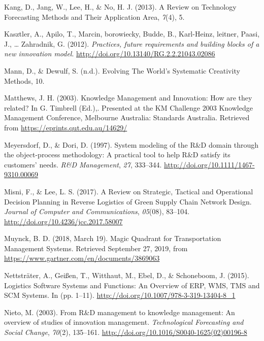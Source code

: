 \documentclass[12pt,twoside]{reedthesis}
\begin{document}
\leavevmode\hypertarget{ref-kangReviewTechnologyForecasting2013}{}%
Kang, D., Jang, W., Lee, H., \& No, H. J. (2013). A Review on Technology Forecasting Methods and Their Application Area, \emph{7}(4), 5.

\leavevmode\hypertarget{ref-kasztlerPracticesFutureRequirements2012}{}%
Kasztler, A., Apilo, T., Marcin, borowiecky, Budde, B., Karl-Heinz, leitner, Paasi, J., \ldots{} Zahradnik, G. (2012). \emph{Practices, future requirements and building blocks of a new innovation model}. \url{http://doi.org/10.13140/RG.2.2.21043.02086}

\leavevmode\hypertarget{ref-mannEvolvingWorldSystematic}{}%
Mann, D., \& Dewulf, S. (n.d.). Evolving The World's Systematic Creativity Methods, 10.

\leavevmode\hypertarget{ref-matthewsKnowledgeManagementInnovation2003}{}%
Matthews, J. H. (2003). Knowledge Management and Innovation: How are they related? In G. Timbrell (Ed.),. Presented at the KM Challenge 2003 Knowledge Management Conference, Melbourne Australia: Standards Australia. Retrieved from \url{https://eprints.qut.edu.au/14629/}

\leavevmode\hypertarget{ref-meyersdorfSystemModelingDomain1997}{}%
Meyersdorf, D., \& Dori, D. (1997). System modeling of the R\&D domain through the object-process methodology: A practical tool to help R\&D satisfy its customers' needs. \emph{R\&D Management}, \emph{27}, 333--344. \url{http://doi.org/10.1111/1467-9310.00069}

\leavevmode\hypertarget{ref-misniReviewStrategicTactical2017}{}%
Misni, F., \& Lee, L. S. (2017). A Review on Strategic, Tactical and Operational Decision Planning in Reverse Logistics of Green Supply Chain Network Design. \emph{Journal of Computer and Communications}, \emph{05}(08), 83--104. \url{http://doi.org/10.4236/jcc.2017.58007}

\leavevmode\hypertarget{ref-bartdemuynckMagicQuadrantTransportation2018}{}%
Muynck, B. D. (2018, March 19). Magic Quadrant for Transportation Management Systems. Retrieved September 27, 2019, from \url{https://www.gartner.com/en/documents/3869063}

\leavevmode\hypertarget{ref-nettstraterLogisticsSoftwareSystems2015}{}%
Nettsträter, A., Geißen, T., Witthaut, M., Ebel, D., \& Schoneboom, J. (2015). Logistics Software Systems and Functions: An Overview of ERP, WMS, TMS and SCM Systems. In (pp. 1--11). \url{http://doi.org/10.1007/978-3-319-13404-8_1}

\leavevmode\hypertarget{ref-nietoManagementKnowledgeManagement2003}{}%
Nieto, M. (2003). From R\&D management to knowledge management: An overview of studies of innovation management. \emph{Technological Forecasting and Social Change}, \emph{70}(2), 135--161. \url{http://doi.org/10.1016/S0040-1625(02)00196-8}
\end{document}
